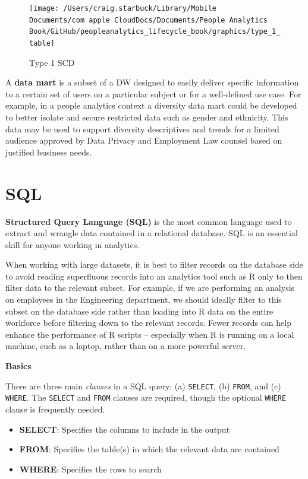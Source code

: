 \documentclass[]{book}
\providecommand{\tightlist}{%
  \setlength{\itemsep}{0pt}\setlength{\parskip}{0pt}}
\begin{document}
\begin{figure}

{\centering \texttt{[image: /Users/craig.starbuck/Library/Mobile Documents/com~apple~CloudDocs/Documents/People Analytics Book/GitHub/peopleanalytics\_lifecycle\_book/graphics/type\_1\_table]} 

}

\caption{Type 1 SCD}\label{fig:type-1-tbl}
\end{figure}

A \textbf{data mart} is a subset of a DW designed to easily deliver specific information to a certain set of users on a particular subject or for a well-defined use case. For example, in a people analytics context a diversity data mart could be developed to better isolate and secure restricted data such as gender and ethnicity. This data may be used to support diversity descriptives and trends for a limited audience approved by Data Privacy and Employment Law counsel based on justified business needs.

\hypertarget{sql}{%
\section{SQL}\label{sql}}

\textbf{Structured Query Language (SQL)} is the most common language used to extract and wrangle data contained in a relational database. SQL is an essential skill for anyone working in analytics.

When working with large datasets, it is best to filter records on the database side to avoid reading superfluous records into an analytics tool such as R only to then filter data to the relevant subset. For example, if we are performing an analysis on employees in the Engineering department, we should ideally filter to this subset on the database side rather than loading into R data on the entire workforce before filtering down to the relevant records. Fewer records can help enhance the performance of R scripts -- especially when R is running on a local machine, such as a laptop, rather than on a more powerful server.

\textbf{Basics}

There are three main \emph{clauses} in a SQL query: (a) \texttt{SELECT}, (b) \texttt{FROM}, and (c) \texttt{WHERE}. The \texttt{SELECT} and \texttt{FROM} clauses are required, though the optional \texttt{WHERE} clause is frequently needed.

\begin{itemize}
\tightlist
\item
  \textbf{SELECT}: Specifies the columns to include in the output
\item
  \textbf{FROM}: Specifies the table(s) in which the relevant data are contained
\item
  \textbf{WHERE}: Specifies the rows to search
\end{itemize}
\end{document}
